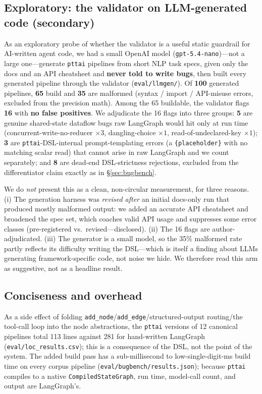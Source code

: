 \documentclass[11pt]{article}
\newcommand{\code}[1]{\texttt{#1}}
\begin{document}
\subsection{Exploratory: the validator on LLM-generated code (secondary)}
\label{sec:llmgen}
As an exploratory probe of whether the validator is a useful static guardrail for
AI-written agent code, we had a small OpenAI model (\code{gpt-5.4-nano})---not a
large one---generate \code{pttai} pipelines from short NLP task specs, given only
the docs and an API cheatsheet and \textbf{never told to write bugs}, then built
every generated pipeline through the validator (\code{eval/llmgen/}). Of
\textbf{100} generated pipelines, \textbf{65} build and \textbf{35} are malformed
(syntax / import / API-misuse errors, excluded from the precision math). Among the
65 buildable, the validator flags \textbf{16} with \textbf{no false positives}. We
adjudicate the 16 flags into three groups: \textbf{5} are genuine shared-state
dataflow bugs raw LangGraph would hit only at run time
(concurrent-write-no-reducer $\times3$, dangling-choice $\times1$,
read-of-undeclared-key $\times1$); \textbf{3} are \code{pttai}-DSL-internal
prompt-templating errors (a \code{\{placeholder\}} with no matching scalar read)
that cannot arise in raw LangGraph and we count separately; and \textbf{8} are
dead-end DSL-strictness rejections, excluded from the differentiator claim exactly
as in \S\ref{sec:bugbench}.

We do \emph{not} present this as a clean, non-circular measurement, for three
reasons. (i) The generation harness was \emph{revised after} an initial docs-only
run that produced mostly malformed output: we added an accurate API cheatsheet and
broadened the spec set, which coaches valid API usage and suppresses some error
classes (pre-registered vs.\ revised---disclosed). (ii) The 16 flags are
author-adjudicated. (iii) The generator is a small model, so the 35\% malformed
rate partly reflects its difficulty writing the DSL---which is itself a finding
about LLMs generating framework-specific code, not noise we hide. We therefore
read this arm as suggestive, not as a headline result.

\subsection{Conciseness and overhead}
As a side effect of folding \code{add\_node}/\code{add\_edge}/structured-output
routing/the tool-call loop into the node abstractions, the \code{pttai} versions
of 12 canonical pipelines total 113 lines against 281 for hand-written LangGraph
(\code{eval/loc\_results.csv}); this is a consequence of the DSL, not the point of
the system. The added build pass has a sub-millisecond to low-single-digit-ms
build time on every corpus pipeline (\code{eval/bugbench/results.json}); because
\code{pttai} compiles to a native \code{CompiledStateGraph}, run time, model-call
count, and output are LangGraph's.
\end{document}
